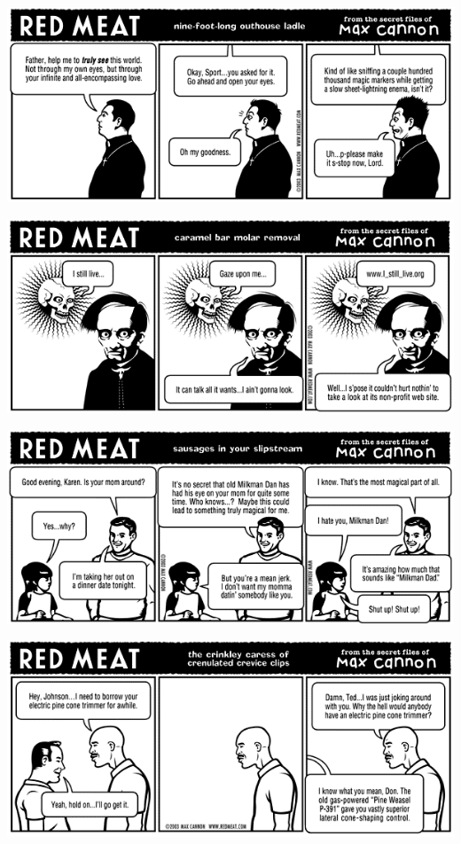 \documentclass[a4paper,twoside,11pt]{article}
\begin{document}
\includegraphics[width=\textwidth]{redmeat_2003-05-13.png}



\includegraphics[width=\textwidth]{redmeat_2003-05-20.png}



\includegraphics[width=\textwidth]{redmeat_2003-05-27.png}



\includegraphics[width=\textwidth]{redmeat_2003-06-03.png}
\end{document}
